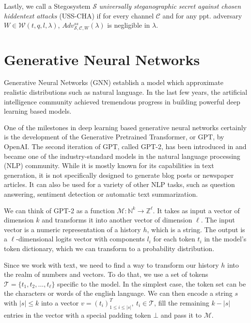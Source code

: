 Lastly, we call a Stegosystem $\mathcal{S}$ \emph{universally steganographic secret against chosen hiddentext attacks} (USS-CHA) if for every channel $\mathcal{C}$ and for any ppt. adversary $W \in \mathcal{W}(t,q,l,\lambda)$, $Adv_{\mathcal{S},\mathcal{C},W}^{ss}(\lambda)$ is negligible in $\lambda$.

\section{Generative Neural Networks}
\label{sec:generative-neural-networks}

Generative Neural Networks (GNN) establish a model which approximate realistic distributions such as natural language.
In the last few years, the artificial intelligence community achieved tremendous progress in building powerful deep learning based models.

One of the milestones in deep learning based generative neural networks certainly is the development of the Generative Pretrained Transformer, or GPT, by OpenAI.
The second iteration of GPT, called GPT-2, has been introduced in \cite{OpenAI2019} and became one of the industry-standard models in the natural language processing (NLP) community.
While it is mostly known for its capabilities in text generation, it is not specifically designed to generate blog posts or newspaper articles.
It can also be used for a variety of other NLP tasks, such as question answering, sentiment detection or automatic text summarization.

We can think of GPT-2 as a function $\mathcal{M} \colon \mathbb{N}^k \rightarrow \mathbb{Z}^\ell$. 
It takes as input a vector of dimension $k$ and transforms it into another vector of dimension $\ell$. 
The input vector is a numeric representation of a history $h$, which is a string.
The output is a $\ell$-dimensional logits vector with components $l_i$ for each token $t_i$ in the model's token dictionary, which we can transform to a probability distribution.

Since we work with text, we need to find a way to transform our history $h$ into the realm of numbers and vectors.
To do that, we use a set of tokens $\mathcal{T} = \{ t_1, t_2, \dots, t_\ell \}$ specific to the model.
In the simplest case, the token set can be the characters or words of the english language.
We can then encode a string $s$ with $|s| \leq k$ into a vector $v = \left(t_i\right)^T_{1 \leq i \leq |s|}, ~t_i \in \mathcal{T}$, fill the remaining $k - |s|$ entries in the vector with a special padding token $\bot$ and pass it to $\mathcal{M}$.
	
